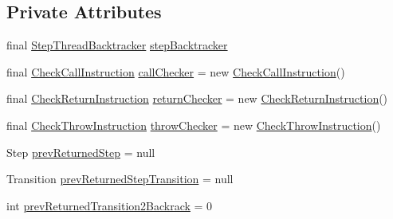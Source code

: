 \subsection*{Private Attributes}
\begin{DoxyCompactItemize}
\item 
final \hyperlink{classgov_1_1nasa_1_1jpf_1_1inspector_1_1server_1_1pathanalysis_1_1_step_thread_backtracker}{Step\+Thread\+Backtracker} \hyperlink{classgov_1_1nasa_1_1jpf_1_1inspector_1_1server_1_1pathanalysis_1_1_method_instruction_backtracker_a2ea6804df5ef427d2fca79d59ca9ce54}{step\+Backtracker}
\item 
final \hyperlink{classgov_1_1nasa_1_1jpf_1_1inspector_1_1server_1_1pathanalysis_1_1_check_call_instruction}{Check\+Call\+Instruction} \hyperlink{classgov_1_1nasa_1_1jpf_1_1inspector_1_1server_1_1pathanalysis_1_1_method_instruction_backtracker_a7e242ba3e246042df4010ccf04f07e8b}{call\+Checker} = new \hyperlink{classgov_1_1nasa_1_1jpf_1_1inspector_1_1server_1_1pathanalysis_1_1_check_call_instruction}{Check\+Call\+Instruction}()
\item 
final \hyperlink{classgov_1_1nasa_1_1jpf_1_1inspector_1_1server_1_1pathanalysis_1_1_check_return_instruction}{Check\+Return\+Instruction} \hyperlink{classgov_1_1nasa_1_1jpf_1_1inspector_1_1server_1_1pathanalysis_1_1_method_instruction_backtracker_aec4b9d62eef1b9f7ee6f98bb97db9fe7}{return\+Checker} = new \hyperlink{classgov_1_1nasa_1_1jpf_1_1inspector_1_1server_1_1pathanalysis_1_1_check_return_instruction}{Check\+Return\+Instruction}()
\item 
final \hyperlink{classgov_1_1nasa_1_1jpf_1_1inspector_1_1server_1_1pathanalysis_1_1_check_throw_instruction}{Check\+Throw\+Instruction} \hyperlink{classgov_1_1nasa_1_1jpf_1_1inspector_1_1server_1_1pathanalysis_1_1_method_instruction_backtracker_abac678f2b4e0d6701d013a196f31649c}{throw\+Checker} = new \hyperlink{classgov_1_1nasa_1_1jpf_1_1inspector_1_1server_1_1pathanalysis_1_1_check_throw_instruction}{Check\+Throw\+Instruction}()
\item 
Step \hyperlink{classgov_1_1nasa_1_1jpf_1_1inspector_1_1server_1_1pathanalysis_1_1_method_instruction_backtracker_aa689e00a1128b6cc672c32cbbe2846e6}{prev\+Returned\+Step} = null
\item 
Transition \hyperlink{classgov_1_1nasa_1_1jpf_1_1inspector_1_1server_1_1pathanalysis_1_1_method_instruction_backtracker_a29373c1b9c7c9711fe636e9387175811}{prev\+Returned\+Step\+Transition} = null
\item 
int \hyperlink{classgov_1_1nasa_1_1jpf_1_1inspector_1_1server_1_1pathanalysis_1_1_method_instruction_backtracker_aa747a06614f7903aa9ff919981f1f4c5}{prev\+Returned\+Transition2\+Backrack} = 0
\end{DoxyCompactItemize}
